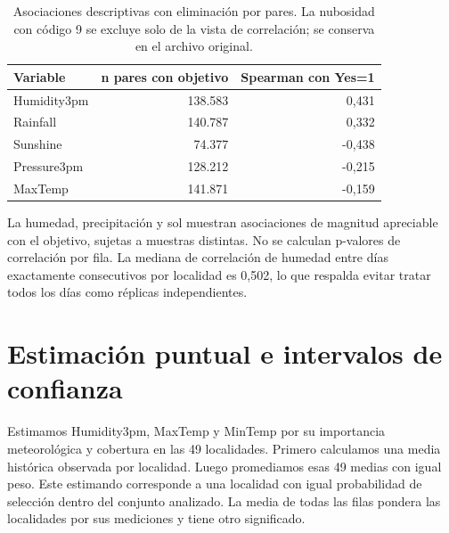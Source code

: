 \documentclass[11pt,a4paper]{article}
\begin{document}
\begin{table}[H]
\centering
\small
\renewcommand{\arraystretch}{1.18}
\setlength{\tabcolsep}{5pt}
\begin{tabularx}{\linewidth}{@{}Yrr@{}}
\toprule

\textbf{Variable} & \textbf{n pares con objetivo} & \textbf{Spearman con Yes=1} \\
\midrule

Humidity3pm & 138.583 & 0,431 \\

Rainfall & 140.787 & 0,332 \\

Sunshine & 74.377 & -0,438 \\

Pressure3pm & 128.212 & -0,215 \\

MaxTemp & 141.871 & -0,159 \\

\bottomrule
\end{tabularx}

\caption{Asociaciones descriptivas con eliminación por pares. La nubosidad con código 9 se excluye solo de la vista de correlación; se conserva en el archivo original.}
\label{tab:5}

\end{table}

La humedad, precipitación y sol muestran asociaciones de magnitud apreciable con el objetivo, sujetas a muestras distintas. No se calculan p-valores de correlación por fila. La mediana de correlación de humedad entre días exactamente consecutivos por localidad es 0,502, lo que respalda evitar tratar todos los días como réplicas independientes.


\clearpage


\section{Estimación puntual e intervalos de confianza}

Estimamos Humidity3pm, MaxTemp y MinTemp por su importancia meteorológica y cobertura en las 49 localidades. Primero calculamos una media histórica observada por localidad. Luego promediamos esas 49 medias con igual peso. Este estimando corresponde a una localidad con igual probabilidad de selección dentro del conjunto analizado. La media de todas las filas pondera las localidades por sus mediciones y tiene otro significado.
\end{document}
